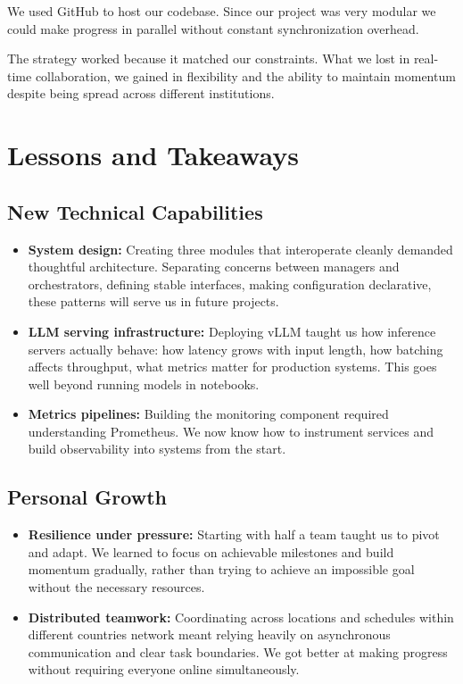 \documentclass[12pt,a4paper]{article}
\begin{document}
We used GitHub to host our codebase. Since our project was very modular we could make progress in parallel without constant synchronization overhead. 

The strategy worked because it matched our constraints. What we lost in real-time collaboration, we gained in flexibility and the ability to maintain momentum despite being spread across different institutions.

\section{Lessons and Takeaways}

\subsection{New Technical Capabilities}


\begin{itemize}
    \item \textbf{System design:} Creating three modules that interoperate cleanly demanded thoughtful architecture. Separating concerns between managers and orchestrators, defining stable interfaces, making configuration declarative, these patterns will serve us in future projects.

    \item \textbf{LLM serving infrastructure:} Deploying vLLM taught us how inference servers actually behave: how latency grows with input length, how batching affects throughput, what metrics matter for production systems. This goes well beyond running models in notebooks.
    
    \item \textbf{Metrics pipelines:} Building the monitoring component required understanding Prometheus. We now know how to instrument services and build observability into systems from the start.
    

\end{itemize}

\subsection{Personal Growth}


\begin{itemize}
    \item \textbf{Resilience under pressure:} Starting with half a team taught us to pivot and adapt. We learned to focus on achievable milestones and build momentum gradually, rather than trying to achieve an impossible goal without the necessary resources.
    
    
    \item \textbf{Distributed teamwork:} Coordinating across locations and schedules within different countries network meant relying heavily on asynchronous communication and clear task boundaries. We got better at making progress without requiring everyone online simultaneously.
    
\end{itemize}
\end{document}

